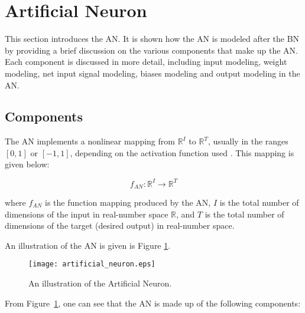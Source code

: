 \section{Artificial Neuron}
\label{sec:anns:an}

This section introduces the \ac{AN}. It is shown how the \ac{AN} is modeled
after the \ac{BN} by providing a brief discussion on the various components that
make up the \ac{AN}. Each component is discussed in more detail, including input
modeling, weight modeling, net input signal modeling,
biases modeling and output modeling in the \ac{AN}.

\subsection{Components}
\label{sec:anns:components}

The \ac{AN} implements a nonlinear mapping from $\mathbb{R}^{I}$ to
$\mathbb{R}^{T}$, usually in the ranges $[0,1]$ or $[-1,1]$, depending on the
activation function used \cite{ref:engelbrecht:2007}. This mapping is given
below:

\begin{equation}
    f_{AN} \colon \mathbb{R}^{I} \to \mathbb{R}^{T}
    \label{eq:an_function_mapping}
\end{equation}

\noindent
where $f_{AN}$ is the function mapping produced by the \ac{AN}, $I$
is the total number of dimensions of the input in real-number space $\mathbb{R}$,
and $T$ is the total number of dimensions of the target (desired output) in
real-number space.

An illustration of the \ac{AN} is given is Figure \ref{fig:artificial_neuron}.

\begin{figure}[htpb]
  \centering
  \texttt{[image: artificial\_neuron.eps]}
  \caption[The Artificial Neuron]{An illustration of
  the Artificial Neuron.}
  \label{fig:artificial_neuron}
\end{figure}

From Figure~\ref{fig:artificial_neuron}, one can see that the
\ac{AN} is made up of the following components:

